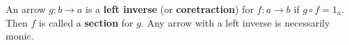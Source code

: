 An arrow $g: b \rightarrow a$ is a \textbf{left inverse} (or \textbf{coretraction}) for $f: a \rightarrow b$ if $g \circ f = 1_a$. Then $f$ is called a \textbf{section} for $g$. Any arrow with a left inverse is necessarily monic.